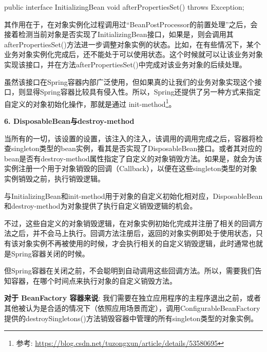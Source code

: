 \begin{Java}
public interface InitializingBean {     
    void afterPropertiesSet() throws Exception; 
} 
\end{Java}

其作用在于，在对象实例化过程调用过“BeanPostProcessor的前置处理”之后，会接着检测当前对象是否实现了InitializingBean接口，如果是，则会调用其afterPropertiesSet()方法进一步调整对象实例的状态。比如，在有些情况下，某个业务对象实例化完成后，还不能处于可以使用状态。这个时候就可以让该业务对象实现该接口，并在方法afterPropertiesSet()中完成对该业务对象的后续处理。

虽然该接口在Spring容器内部广泛使用，但如果真的让我们的业务对象实现这个接口，则显得Spring容器比较具有侵入性。所以，Spring还提供了另一种方式来指定自定义的对象初始化操作，那就是通过 init-method\footnote{参考: \url{https://blog.csdn.net/tuzongxun/article/details/53580695}}。

\noindent\textbf{6. DisposableBean与destroy-method}

当所有的一切，该设置的设置，该注入的注入，该调用的调用完成之后，容器将检查singleton类型的bean实例，看其是否实现了DisposableBean接口。或者其对应的bean是否有destroy-method属性指定了自定义的对象销毁方法。如果是，就会为该实例注册一个用于对象销毁的回调（Callback），以便在这些singleton类型的对象实例销毁之前，执行销毁逻辑。

与InitializingBean和init-method用于对象的自定义初始化相对应，DisposableBean和destroy-method为对象提供了执行自定义销毁逻辑的机会。

不过，这些自定义的对象销毁逻辑，在对象实例初始化完成并注册了相关的回调方法之后，并不会马上执行。回调方法注册后，返回的对象实例即处于使用状态，只有该对象实例不再被使用的时候，才会执行相关的自定义销毁逻辑，此时通常也就是Spring容器关闭的时候。

但Spring容器在关闭之前，不会聪明到自动调用这些回调方法。所以，需要我们告知容器，在哪个时间点来执行对象的自定义销毁方法。

\textbf{对于 BeanFactory 容器来说}: 我们需要在独立应用程序的主程序退出之前，或者其他被认为是合适的情况下（依照应用场景而定），调用ConfigurableBeanFactory提供的destroySingletons()方法销毁容器中管理的所有singleton类型的对象实例。

\newpage  